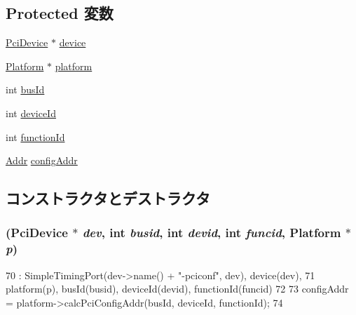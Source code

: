 \subsection*{Protected 変数}
\begin{DoxyCompactItemize}
\item 
\hyperlink{classPciDevice}{PciDevice} $\ast$ \hyperlink{classPciDevice_1_1PciConfigPort_a9f9600bae2078d3e0d11c471e5e34488}{device}
\item 
\hyperlink{classPlatform}{Platform} $\ast$ \hyperlink{classPciDevice_1_1PciConfigPort_a75b48f1787959a4617f2a599d7c09aab}{platform}
\item 
int \hyperlink{classPciDevice_1_1PciConfigPort_a5071e865d44deeb430a3bce2cb2689a0}{busId}
\item 
int \hyperlink{classPciDevice_1_1PciConfigPort_ae33571d7242e04fb46496c9852fad407}{deviceId}
\item 
int \hyperlink{classPciDevice_1_1PciConfigPort_a2f4fdcfa0ddbad69ad60222dd5676868}{functionId}
\item 
\hyperlink{base_2types_8hh_af1bb03d6a4ee096394a6749f0a169232}{Addr} \hyperlink{classPciDevice_1_1PciConfigPort_aab0054b91c8a54dc6f07615338b2e78d}{configAddr}
\end{DoxyCompactItemize}


\subsection{コンストラクタとデストラクタ}
\hypertarget{classPciDevice_1_1PciConfigPort_add98ce4360ec75b21c2f357b7a233acf}{
\subsubsection[{PciConfigPort}]{ ({\bf PciDevice} $\ast$ {\em dev}, \/  int {\em busid}, \/  int {\em devid}, \/  int {\em funcid}, \/  {\bf Platform} $\ast$ {\em p})}}
\label{classPciDevice_1_1PciConfigPort_add98ce4360ec75b21c2f357b7a233acf}



\begin{DoxyCode}
70     : SimpleTimingPort(dev->name() + "-pciconf", dev), device(dev),
71       platform(p), busId(busid), deviceId(devid), functionId(funcid)
72 {
73     configAddr = platform->calcPciConfigAddr(busId, deviceId, functionId);
74 }
\end{DoxyCode}


